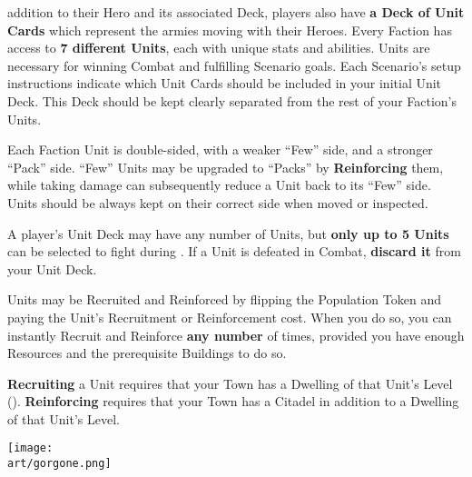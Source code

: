 
\begin{multicols*}{2}

 addition to their Hero and its associated Deck, players also have \textbf{a Deck of Unit Cards} which represent the armies moving with their Heroes.
Every Faction has access to \textbf{7 different Units}, each with unique stats and abilities.
Units are necessary for winning Combat and fulfilling Scenario goals.
Each Scenario's setup instructions indicate which Unit Cards should be included in your initial Unit Deck.
This Deck should be kept clearly separated from the rest of your Faction's Units.\par
Each Faction Unit is double-sided, with a weaker ``Few'' side, and a stronger ``Pack'' side.
``Few'' Units may be upgraded to ``Packs'' by \textbf{Reinforcing} them, while taking damage can subsequently reduce a Unit back to its ``Few'' side.
Units should be always kept on their correct side when moved or inspected.\par
A player's Unit Deck may have any number of Units, but \textbf{only up to 5 Units} can be selected to fight during .
If a Unit is defeated in Combat, \textbf{discard it} from your Unit Deck.\par
Units may be Recruited and Reinforced by flipping the Population Token and paying the Unit's Recruitment  or Reinforcement  cost.
When you do so, you can instantly Recruit and Reinforce \textbf{any number} of times, provided you have enough Resources and the prerequisite Buildings to do so.\par
\textbf{Recruiting} a Unit requires that your Town has a Dwelling of that Unit's Level ().
\textbf{Reinforcing} requires that your Town has a Citadel in addition to a Dwelling of that Unit's Level.\par


\vspace*{\fill}
\iftoggle{printable}{}{\hspace{1em}}
{\texttt{[image: \\art/gorgone.png]}}
\vspace*{2em}

\clearpage

\end{multicols*}

